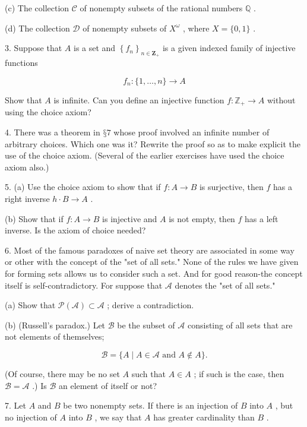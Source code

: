 (c) The collection \(\mathcal{C}\) of nonempty subsets of the rational numbers \(\mathbb{Q}\) .

(d) The collection \(\mathcal{D}\) of nonempty subsets of \({X}^{\omega }\) , where \(X = \{ 0,1\}\) .

3. Suppose that \(A\) is a set and \({\left\{  {f}_{n}\right\}  }_{n \in  {\mathbf{Z}}_{ + }}\) is a given indexed family of injective functions

\[
{f}_{n} : \{ 1,\ldots ,n\}  \rightarrow  A
\]

Show that \(A\) is infinite. Can you define an injective function \(f : {\mathbb{Z}}_{ + } \rightarrow  A\) without using the choice axiom?

4. There was a theorem in \(§7\) whose proof involved an infinite number of arbitrary choices. Which one was it? Rewrite the proof so as to make explicit the use of the choice axiom. (Several of the earlier exercises have used the choice axiom also.)

5. (a) Use the choice axiom to show that if \(f : A \rightarrow  B\) is surjective, then \(f\) has a right inverse \(h \cdot  B \rightarrow  A\) .

(b) Show that if \(f : A \rightarrow  B\) is injective and \(A\) is not empty, then \(f\) has a left inverse. Is the axiom of choice needed?

6. Most of the famous paradoxes of naive set theory are associated in some way or other with the concept of the "set of all sets." None of the rules we have given for forming sets allows us to consider such a set. And for good reason-the concept itself is self-contradictory. For suppose that \(\mathcal{A}\) denotes the "set of all sets."

(a) Show that \(\mathcal{P}\left( \mathcal{A}\right)  \subset  \mathcal{A}\) ; derive a contradiction.

(b) (Russell’s paradox.) Let \(\mathcal{B}\) be the subset of \(\mathcal{A}\) consisting of all sets that are not elements of themselves;

\[
\mathcal{B} = \{ A \mid  A \in  \mathcal{A}\text{ and }A \notin  A\} .
\]

(Of course, there may be no set \(A\) such that \(A \in  A\) ; if such is the case, then \(\mathcal{B} = \mathcal{A}\) .) Is \(\mathcal{B}\) an element of itself or not?

7. Let \(A\) and \(B\) be two nonempty sets. If there is an injection of \(B\) into \(A\) , but no injection of \(A\) into \(B\) , we say that \(A\) has greater cardinality than \(B\) .

